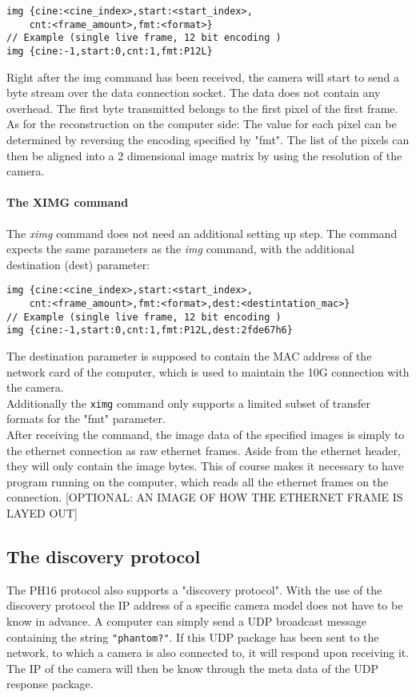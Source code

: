 \begin{lstlisting}
img {cine:<cine_index>,start:<start_index>,
	cnt:<frame_amount>,fmt:<format>}
// Example (single live frame, 12 bit encoding )
img {cine:-1,start:0,cnt:1,fmt:P12L}
\end{lstlisting}
Right after the img command has been received, the camera will start to send a byte stream over the data connection socket. The data does not contain any overhead. The first byte transmitted belongs to the first pixel of the first frame.\\
As for the reconstruction on the computer side: The value for each pixel can be determined by reversing the encoding specified by "fmt". The list of the pixels can then be aligned into a 2 dimensional image matrix by using the resolution of the camera.

\paragraph{The XIMG command}
The \textit{ximg} command does not need an additional setting up step. The command expects the same parameters as the \textit{img} command, with the additional destination (dest) parameter:
\begin{lstlisting}
img {cine:<cine_index>,start:<start_index>,
	cnt:<frame_amount>,fmt:<format>,dest:<destintation_mac>}
// Example (single live frame, 12 bit encoding )
img {cine:-1,start:0,cnt:1,fmt:P12L,dest:2fde67h6}
\end{lstlisting}
The destination parameter is supposed to contain the MAC address of the network card of the computer, which is used to maintain the 10G connection with the camera.\\
Additionally the \texttt{ximg} command only supports a limited subset of transfer formats for the "fmt" parameter.\\
After receiving the command, the image data of the specified images is simply to the ethernet connection as raw ethernet frames. Aside from the ethernet header, they will only contain the image bytes. This of course makes it necessary to have program running on the computer, which reads all the ethernet frames on the connection.
[OPTIONAL: AN IMAGE OF HOW THE ETHERNET FRAME IS LAYED OUT]

\subsection{The discovery protocol}
The PH16 protocol also supports a "discovery protocol". With the use of the discovery protocol the IP address of a specific camera model does not have to be know in advance. A computer can simply send a UDP broadcast message containing the string \texttt{"phantom?"}. If this UDP package has been sent to the network, to which a camera is also connected to, it will respond upon receiving it. The IP of the camera will then be know through the meta data of the UDP response package.

